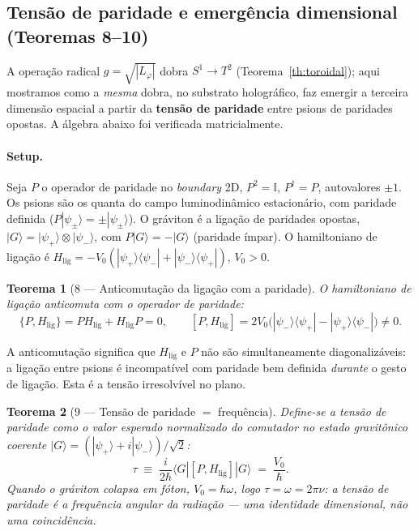 \documentclass[12pt,a4paper]{article}
\newtheorem*{theoremfixed}{Teorema}
\newcommand{\Lphi}{L_{\varphi}}
\begin{document}
\subsection{Tensão de paridade e emergência dimensional (Teoremas 8--10)}
\label{sec:parity-tension}

A operação radical $g = \sqrt{|\Lphi|}$ dobra $S^{1} \to T^{2}$
(Teorema~\ref{th:toroidal}); aqui mostramos como a \emph{mesma} dobra, no
substrato holográfico, faz emergir a terceira dimensão espacial a partir da
\textbf{tensão de paridade} entre psions de paridades opostas.  A álgebra abaixo
foi verificada matricialmente.

\paragraph{Setup.}  Seja $P$ o operador de paridade no \emph{boundary} 2D,
$P^{2} = \mathbb{I}$, $P^{\dagger} = P$, autovalores $\pm 1$.  Os psions são os
quanta do campo luminodinâmico estacionário, com paridade definida
($P|\psi_{\pm}\rangle = \pm|\psi_{\pm}\rangle$).  O gráviton é a ligação de
paridades opostas, $|G\rangle = |\psi_{+}\rangle \otimes |\psi_{-}\rangle$, com
$P|G\rangle = -|G\rangle$ (paridade ímpar).  O hamiltoniano de ligação é
$H_{\text{lig}} = -V_{0}(|\psi_{+}\rangle\langle\psi_{-}| +
|\psi_{-}\rangle\langle\psi_{+}|)$, $V_{0} > 0$.

\begin{theoremfixed}[8 --- Anticomutação da ligação com a paridade]
\label{th:anticommute}
O hamiltoniano de ligação anticomuta com o operador de paridade:
\begin{equation}
\{P, H_{\text{lig}}\} = P H_{\text{lig}} + H_{\text{lig}} P = 0,
\qquad
[P, H_{\text{lig}}] = 2V_{0}\bigl(|\psi_{-}\rangle\langle\psi_{+}| -
|\psi_{+}\rangle\langle\psi_{-}|\bigr) \neq 0.
\end{equation}
\end{theoremfixed}

\noindent A anticomutação significa que $H_{\text{lig}}$ e $P$ não são
simultaneamente diagonalizáveis: a ligação entre psions é incompatível com
paridade bem definida \emph{durante} o gesto de ligação.  Esta é a tensão
irresolvível no plano.

\begin{theoremfixed}[9 --- Tensão de paridade $=$ frequência]
\label{th:tension-freq}
Define-se a tensão de paridade como o valor esperado normalizado do comutador no
estado gravitônico \emph{coerente} $|G\rangle = (|\psi_{+}\rangle +
i|\psi_{-}\rangle)/\sqrt{2}$:
\begin{equation}
\tau \;\equiv\; \frac{i}{2\hbar}\langle G|[P, H_{\text{lig}}]|G\rangle
\;=\; \frac{V_{0}}{\hbar}.
\end{equation}
Quando o gráviton colapsa em fóton, $V_{0} = \hbar\omega$, logo
$\tau = \omega = 2\pi\nu$: a tensão de paridade \emph{é} a frequência angular da
radiação --- uma identidade dimensional, não uma coincidência.
\end{theoremfixed}
\end{document}
